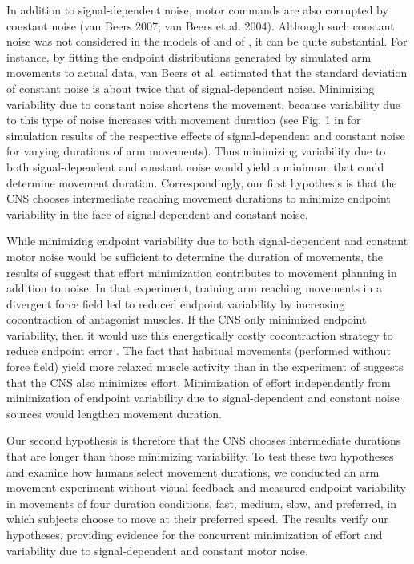 In addition to signal-dependent noise, motor commands are also corrupted by constant noise \cite{VanBeers2007, VanBeers2004} (van Beers 2007; van Beers et al. 2004). Although such constant noise was not considered in the models of \cite{Harris1998, Harris2006} and of \cite{OSullivan2009}, it can be quite substantial. For instance, by fitting the endpoint distributions generated by simulated arm movements to actual data, van Beers et al. \cite{VanBeers2004} estimated that the standard deviation of constant noise is about twice that of signal-dependent noise. 
Minimizing variability due to constant noise shortens the movement, because variability due to this type of noise increases with movement duration (see Fig. 1 in \cite{Todorov2005} for simulation results of the respective effects of signal-dependent and constant noise for varying durations of arm movements). 
Thus minimizing variability due to both signal-dependent and constant noise would yield a minimum that could determine movement duration. 
Correspondingly, our first hypothesis is that the CNS chooses intermediate reaching movement durations to minimize endpoint variability in the face of signal-dependent and constant noise.

While minimizing endpoint variability due to both signal-dependent and constant motor noise would be sufficient to determine the duration of movements, the results of \cite{Burdet2001}  suggest that effort minimization contributes to movement planning in addition to noise. 
In that experiment, training arm reaching movements in a divergent force field led to reduced endpoint variability by increasing cocontraction of antagonist muscles. If the CNS only minimized endpoint variability, then it would use this energetically costly cocontraction strategy to reduce endpoint error \cite{Osu2004}. The fact that habitual movements (performed without force field) yield more relaxed muscle activity than in the experiment of \cite{Burdet2001} suggests that the CNS also minimizes effort. 
Minimization of effort independently from minimization of endpoint variability due to signal-dependent and constant noise sources would lengthen movement duration.

Our second hypothesis is therefore that the CNS chooses intermediate durations that are longer than those minimizing variability. 
To test these two hypotheses and examine how humans select movement durations, we conducted an arm movement experiment without visual feedback and measured endpoint variability in movements of four duration conditions, fast, medium, slow, and preferred, in which subjects choose to move at their preferred speed. The results verify our hypotheses, providing evidence for the concurrent minimization of effort and variability due to signal-dependent and constant motor noise.

